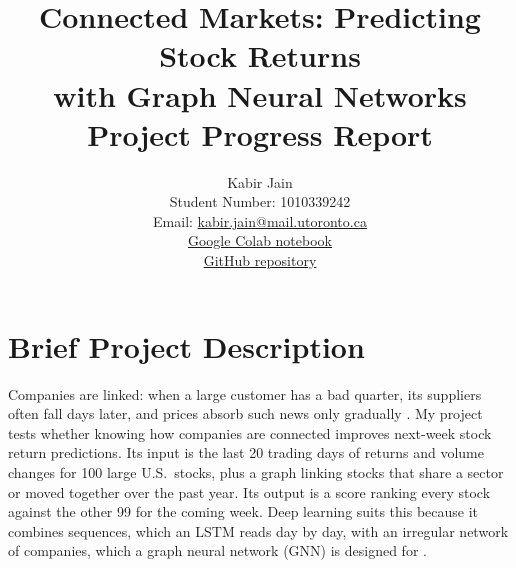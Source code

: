 \documentclass[final]{article}
\title{Connected Markets: Predicting Stock Returns\\with Graph Neural Networks\\[2pt]{\large Project Progress Report}}
\author{%
  Kabir Jain \\
  Student Number: 1010339242\\
  Email: \href{mailto:kabir.jain@mail.utoronto.ca}{kabir.jain@mail.utoronto.ca}\\
  \href{https://colab.research.google.com/drive/1BibeXLFHFts0R9ro75Up_cdv6xue14fy}{Google Colab notebook}\\
  \href{https://github.com/Kabirjain01/Connected-Markets}{GitHub repository}\\
}
\begin{document}
\maketitle

\vspace{-0.45in}

\section*{Brief Project Description}
Companies are linked: when a large customer has a bad quarter, its suppliers often fall days later, and prices absorb such news only gradually \cite{cohen2008economic}. My project tests whether knowing how companies are connected improves next-week stock return predictions. Its input is the last 20 trading days of returns and volume changes for 100 large U.S.\ stocks, plus a graph linking stocks that share a sector or moved together over the past year. Its output is a score ranking every stock against the other 99 for the coming week. Deep learning suits this because it combines sequences, which an LSTM reads day by day, with an irregular network of companies, which a graph neural network (GNN) is designed for \cite{feng2019temporal, kim2019hats, xu2021hist}.
\end{document}
